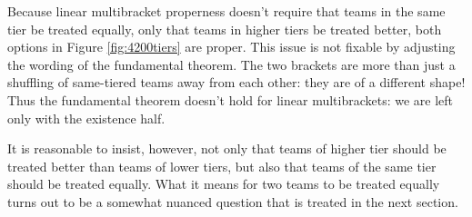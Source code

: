 {    

    Because linear multibracket properness doesn't require that teams in the same tier be treated equally, only that teams in higher tiers be treated better, both options in Figure \ref{fig:4200tiers} are proper. This issue is not fixable by adjusting the wording of the fundamental theorem. The two brackets are more than just a shuffling of same-tiered teams away from each other: they are of a different shape! Thus the fundamental theorem doesn't hold for linear multibrackets: we are left only with the existence half.


    It is reasonable to insist, however, not only that teams of higher tier should be treated better than teams of lower tiers, but also that teams of the same tier should be treated equally. What it means for two teams to be treated equally turns out to be a somewhat nuanced question that is treated in the next section.
}